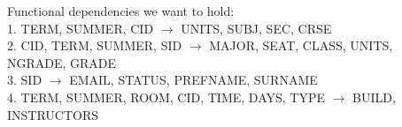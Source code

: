 Functional dependencies we want to hold:\\
1. TERM, SUMMER, CID $\rightarrow$ UNITS, SUBJ, SEC, CRSE\\
2. CID, TERM, SUMMER, SID $\rightarrow$ MAJOR, SEAT, CLASS, UNITS, NGRADE, GRADE\\
3. SID $\rightarrow$ EMAIL, STATUS, PREFNAME, SURNAME\\
4. TERM, SUMMER, ROOM, CID, TIME, DAYS, TYPE $\rightarrow$ BUILD, INSTRUCTORS\\